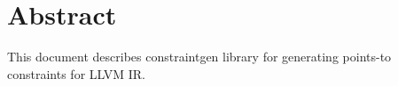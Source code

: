 \section{Abstract}

This document describes constraintgen library for generating points-to constraints for LLVM IR. 
